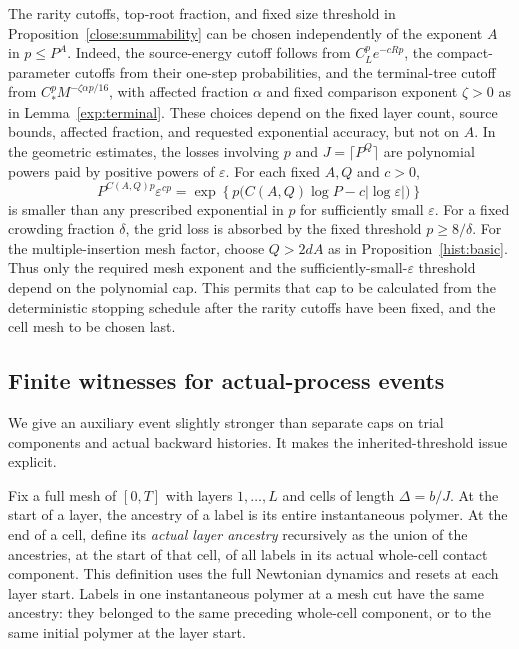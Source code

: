 \begin{remark}
The rarity cutoffs, top-root fraction, and fixed size threshold in
Proposition~\ref{close:summability} can be chosen independently of
the exponent $A$ in $p\leq P^A$.
Indeed, the source-energy cutoff follows from
$C_L^p e^{-cRp}$, the compact-parameter cutoffs from their one-step
probabilities, and the terminal-tree cutoff from
$C_*^p M^{-\zeta\alpha p/16}$, with affected fraction $\alpha$ and
fixed comparison exponent $\zeta>0$ as in Lemma~\ref{exp:terminal}.
These choices depend on the fixed layer count, source bounds, affected
fraction, and requested exponential accuracy, but not on $A$.
In the geometric estimates, the losses involving $p$ and $J=\lceil P^Q\rceil$ are
polynomial powers paid by positive powers of $\varepsilon$.
For each fixed $A,Q$ and $c>0$,
\[
 P^{C(A,Q)p}\varepsilon^{cp}
 =\exp\!\left\{p\bigl(C(A,Q)\log P-c|\log\varepsilon|\bigr)\right\}
\]
is smaller than any prescribed exponential in $p$ for sufficiently
small $\varepsilon$. For a fixed crowding fraction $\delta$, the grid
loss is absorbed by the fixed threshold $p\geq8/\delta$.
For the multiple-insertion mesh factor,
choose $Q>2dA$ as in Proposition~\ref{hist:basic}.
Thus only the required mesh exponent and the sufficiently-small-$\varepsilon$
threshold depend on the polynomial cap. This permits that cap to be
calculated from the deterministic stopping schedule after the rarity
cutoffs have been fixed, and the cell mesh to be chosen last.
\end{remark}

\subsection{Finite witnesses for actual-process events}
\label{close:witnesses}

We give an auxiliary event slightly stronger than separate caps
on trial components and actual backward histories. It makes the
inherited-threshold issue explicit.

Fix a full mesh of $[0,T]$ with layers $1,\ldots,L$ and cells
of length $\Delta=b/J$. At the start of a layer, the ancestry of
a label is its entire instantaneous polymer. At the end of a
cell, define its \emph{actual layer ancestry} recursively as the
union of the ancestries, at the start of that cell, of all labels
in its actual whole-cell contact component. This definition uses
the full Newtonian dynamics and resets at each layer start.
Labels in one instantaneous polymer at a mesh cut have the same
ancestry: they belonged to the same preceding whole-cell
component, or to the same initial polymer at the layer start.

